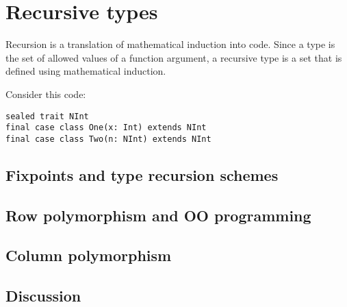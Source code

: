 
\chapter{Recursive types\label{chap:Recursive-types}}

Recursion is a translation of mathematical induction into code. Since
a type is the set of allowed values of a function argument, a recursive
type is a set that is defined using mathematical induction.

Consider this code:
\begin{lstlisting}
sealed trait NInt
final case class One(x: Int) extends NInt
final case class Two(n: NInt) extends NInt
\end{lstlisting}


\section{Fixpoints and type recursion schemes}

\section{Row polymorphism and OO programming}

\section{Column polymorphism}

\section{Discussion}

\begin{comment}
\end{comment}

